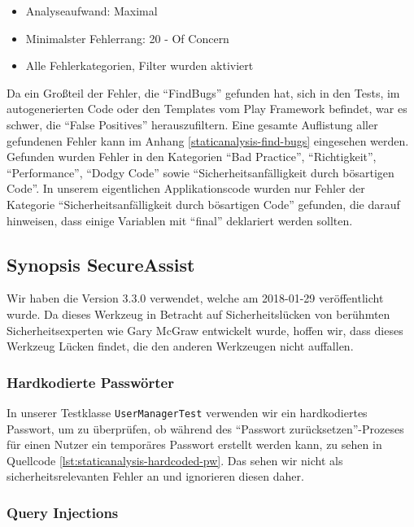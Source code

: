\documentclass[12pt,DIV14,BCOR10mm,a4paper,parskip=half-,headsepline,headinclude,english,ngerman,bibliography=totocnumbered]{scrreprt}
\begin{document}
\begin{itemize}
  \item Analyseaufwand: Maximal
  \item Minimalster Fehlerrang: 20 - Of Concern
  \item Alle Fehlerkategorien, Filter wurden aktiviert
\end{itemize}

Da ein Großteil der Fehler, die \enquote{FindBugs} gefunden hat, sich in den Tests, im autogenerierten Code oder den Templates vom Play Framework befindet, war es schwer, die \enquote{False Positives} herauszufiltern.
Eine gesamte Auflistung aller gefundenen Fehler kann im Anhang \ref{staticanalysis-find-bugs} eingesehen werden.
Gefunden wurden Fehler in den Kategorien \enquote{Bad Practice}, \enquote{Richtigkeit}, \enquote{Performance}, \enquote{Dodgy Code} sowie \enquote{Sicherheitsanfälligkeit durch bösartigen Code}.
In unserem eigentlichen Applikationscode wurden nur Fehler der Kategorie \enquote{Sicherheitsanfälligkeit durch bösartigen Code} gefunden, die darauf hinweisen, dass einige Variablen mit \enquote{final} deklariert werden sollten.

\subsection{Synopsis SecureAssist}

Wir haben die Version 3.3.0 verwendet, welche am 2018-01-29 veröffentlicht wurde.
Da dieses Werkzeug in Betracht auf Sicherheitslücken von berühmten Sicherheitsexperten wie Gary McGraw entwickelt wurde, hoffen wir, dass dieses Werkzeug Lücken findet, die den anderen Werkzeugen nicht auffallen.

\subsubsection{Hardkodierte Passwörter}

In unserer Testklasse \texttt{UserManagerTest} verwenden wir ein hardkodiertes Passwort, um zu überprüfen, ob während des \enquote{Passwort zurücksetzen}-Prozeses für einen Nutzer ein temporäres Passwort erstellt werden kann, zu sehen in Quellcode \ref{lst:staticanalysis-hardcoded-pw}.
Das sehen wir nicht als sicherheitsrelevanten Fehler an und ignorieren diesen daher.

\subsubsection{Query Injections}
\end{document}
